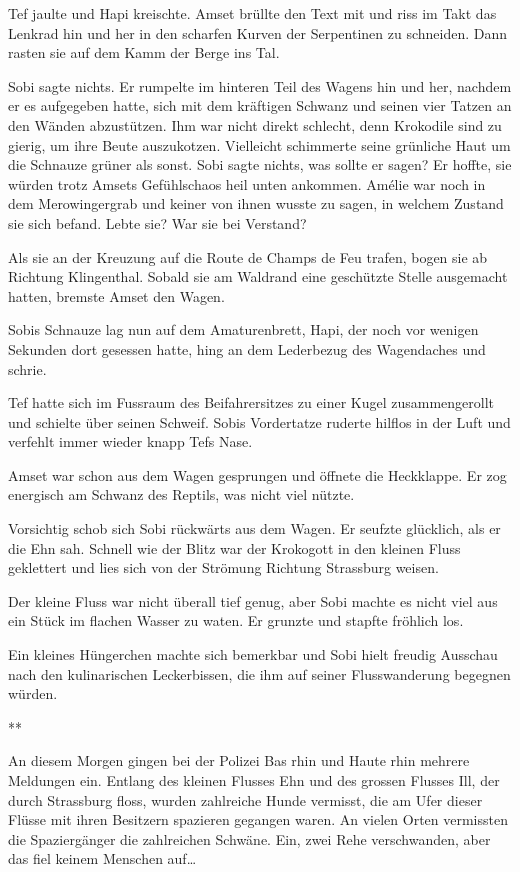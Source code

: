 \documentclass[11pt,titlepage,a5paper]{book}
\newcommand{\sterne}{\par{\centering ***\par}}
\begin{document}
Tef jaulte und Hapi kreischte. Amset brüllte den Text mit und riss im Takt das Lenkrad hin und her in den scharfen Kurven der Serpentinen zu schneiden. Dann rasten sie auf dem Kamm der Berge ins Tal.

Sobi sagte nichts. Er rumpelte im hinteren Teil des Wagens hin und her, nachdem er es aufgegeben hatte, sich mit dem kräftigen Schwanz und seinen vier Tatzen an den Wänden abzustützen. Ihm war nicht direkt schlecht, denn Krokodile sind zu gierig, um ihre Beute auszukotzen. Vielleicht schimmerte seine grünliche Haut um die Schnauze grüner als sonst. Sobi sagte nichts, was sollte er sagen? Er hoffte, sie würden trotz Amsets Gefühlschaos heil unten ankommen. Amélie war noch in dem Merowingergrab und keiner von ihnen wusste zu sagen, in welchem Zustand sie sich befand. Lebte sie? War sie bei Verstand?

Als sie an der Kreuzung auf die Route de Champs de Feu trafen, bogen sie ab Richtung Klingenthal. Sobald sie am Waldrand eine geschützte Stelle ausgemacht hatten, bremste Amset den Wagen. 

Sobis Schnauze lag nun auf dem Amaturenbrett, Hapi, der noch vor wenigen Sekunden dort gesessen hatte, hing an dem Lederbezug des Wagendaches und schrie.

Tef hatte sich im Fussraum des Beifahrersitzes zu einer Kugel zusammengerollt und schielte über seinen Schweif. Sobis Vordertatze ruderte hilflos in der Luft und verfehlt immer wieder knapp Tefs Nase. 

Amset war schon aus dem Wagen gesprungen und öffnete die Heckklappe. Er zog energisch am Schwanz des Reptils, was nicht viel nützte.

Vorsichtig schob sich Sobi rückwärts aus dem Wagen. Er seufzte glücklich, als er die Ehn sah. Schnell wie der Blitz war der Krokogott in den kleinen Fluss geklettert und lies sich von der Strömung Richtung Strassburg weisen.

Der kleine Fluss war nicht überall tief genug, aber Sobi machte es nicht viel aus ein Stück im flachen Wasser zu waten. Er grunzte und stapfte fröhlich los.

Ein kleines Hüngerchen machte sich bemerkbar und Sobi hielt freudig Ausschau nach den kulinarischen Leckerbissen, die ihm auf seiner Flusswanderung begegnen würden. 

\sterne

An diesem Morgen gingen bei der Polizei Bas rhin und Haute rhin mehrere Meldungen ein. Entlang des kleinen Flusses Ehn und des grossen Flusses Ill, der durch Strassburg floss, wurden zahlreiche Hunde vermisst, die am Ufer dieser Flüsse mit ihren Besitzern spazieren gegangen waren. An vielen Orten vermissten die Spaziergänger die zahlreichen Schwäne. Ein, zwei Rehe verschwanden, aber das fiel keinem Menschen auf\dots 
\end{document}
